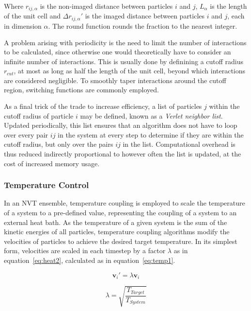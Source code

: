 \documentclass[11pt]{article}
\begin{document}
\bigskip

\noindent Where $r_{ij,\alpha}$ is the non-imaged distance between particles $i$ and $j$, $L_\alpha$ is the length of the unit cell and $\Delta r_{ij,\alpha}'$ is the imaged distance between particles $i$ and $j$, each in dimension $\alpha$. The round function rounds the fraction to the nearest integer.
\\ \par \noindent A problem arising with periodicity is the need to limit the number of interactions to be calculated, since otherwise one would theoretically have to consider an infinite number of interactions. This is usually done by definining a cutoff radius $r_{cut}$, at most as long as half the length of the unit cell, beyond which interactions are considered negligible. To smoothly taper interactions around the cutoff region, switching functions are commonly employed. \\ \par \noindent As a final trick of the trade to increase efficiency, a list of particles $j$ within the cutoff radius of particle $i$ may be defined, known as a \textit{Verlet neighbor list}. Updated periodically, this list ensures that an algorithm does not have to loop over every pair $ij$ in the system at every step to determine if they are within the cutoff radius, but only over the pairs $ij$ in the list. Computational overhead is thus reduced indirectly proportional to however often the list is updated, at the cost of increased memory usage.

\subsubsection{Temperature Control}
In an NVT ensemble, temperature coupling is employed to scale the temperature of a system to a pre-defined value, representing the coupling of a system to an external heat bath. As the temperature of a given system is the sum of the kinetic energies of all particles, temperature coupling algorithms modify the velocities of particles to achieve the desired target temperature. In its simplest form, velocities are scaled in each timestep by a factor $\lambda$ as in equation~\ref{eq:heat2}, calculated as in equation~\ref{eq:temp1}.

\begin{equation}
  \textbf{v}_i' = \lambda \textbf{v}_i
  \label{eq:heat2}
\end{equation}

\begin{equation}
  \lambda = \sqrt{\frac{T_{Target}}{T_{System}}}
  \label{eq:temp1}
\end{equation}
\end{document}
